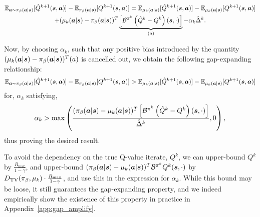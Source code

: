\begin{multline*}
    \mathbb{E}_{\boldsymbol{a} \sim {\pi_\beta}(\boldsymbol{a}|\boldsymbol{s})}[\hat{Q}^{k+1}(\boldsymbol{s}, \boldsymbol{a})] - \mathbb{E}_{{\pi_\beta}(\boldsymbol{a}|\boldsymbol{s})}[{Q}^{k+1}(\boldsymbol{s}, \boldsymbol{a})] = \mathbb{E}_{\mu_k(\boldsymbol{a}|\boldsymbol{s})}[\hat{Q}^{k+1}(\boldsymbol{s}, \boldsymbol{a})] - \mathbb{E}_{\mu_k(\boldsymbol{a}|\boldsymbol{s})}[{Q}^{k+1}(\boldsymbol{s}, \boldsymbol{a})]\\
    + (\mu_k(\boldsymbol{a}|\boldsymbol{s}) - {\pi_\beta}(\boldsymbol{a}|\boldsymbol{s}))^T \underbrace{\left[ \mathcal{B}^{\pi^k} \left( \hat{Q}^k - Q^k \right)(\boldsymbol{s}, \cdot) \right]}_{(a)}- \alpha_k \hat{\Delta}^k.
\end{multline*}

Now, by choosing $\alpha_k$, such that any positive bias introduced by the quantity $(\mu_k(\boldsymbol{a}|\boldsymbol{s}) - {\pi_\beta}(\boldsymbol{a}|\boldsymbol{s}))^T (a)$ is cancelled out, we obtain the following gap-expanding relationship:
\begin{equation*}
    \mathbb{E}_{\boldsymbol{a} \sim {\pi_\beta}(\boldsymbol{a}|\boldsymbol{s})}[\hat{Q}^{k+1}(\boldsymbol{s}, \boldsymbol{a})] - \mathbb{E}_{{\pi_\beta}(\boldsymbol{a}|\boldsymbol{s})}[{Q}^{k+1}(\boldsymbol{s}, \boldsymbol{a})] > \mathbb{E}_{\mu_k(\boldsymbol{a}|\boldsymbol{s})}[\hat{Q}^{k+1}(\boldsymbol{s}, \boldsymbol{a})] - \mathbb{E}_{\mu_k(\boldsymbol{a}|\boldsymbol{s})}[{Q}^{k+1}(\boldsymbol{s}, \boldsymbol{a})]
\end{equation*}
for, $\alpha_k$ satisfying, 
\begin{equation*}
    \alpha_k > \max \left(\frac{({\pi_\beta}(\boldsymbol{a}|\boldsymbol{s}) - \mu_k(\boldsymbol{a}|\boldsymbol{s}))^T \left[ \mathcal{B}^{\pi^k} \left( \hat{Q}^k - Q^k \right)(\boldsymbol{s}, \cdot) \right]}{\hat{\Delta}^k}, 0\right),
\end{equation*}
thus proving the desired result.

To avoid the dependency on the true Q-value iterate, ${Q}^k$, we can upper-bound $Q^k$ by $\frac{R_{\max}}{1 - \gamma}$, and upper-bound $({\pi_\beta}(\boldsymbol{a}|\boldsymbol{s}) - \mu_k(\boldsymbol{a}|\boldsymbol{s}))^T \mathcal{B}^{\pi^k} Q^k (\boldsymbol{s}, \cdot)$ by $D_{\mathrm{TV}}({\pi_\beta}, \mu_k) \cdot \frac{R_{\max}}{1 - \gamma}$, and use this in the expression for $\alpha_k$. While this bound may be loose, it still guarantees the gap-expanding property, and we indeed empirically show the existence of this property in practice in Appendix~\ref{app:gap_amplify}. 

